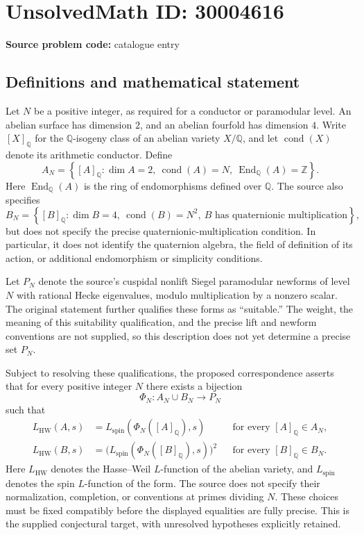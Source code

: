 \documentclass[11pt]{article}
\newcommand{\Z}{\mathbb{Z}}
\newcommand{\Q}{\mathbb{Q}}
\begin{document}
\section*{UnsolvedMath ID: 30004616}
\textbf{Source problem code:} catalogue entry
\subsection{Definitions and mathematical statement}
Let \(N\) be a positive integer, as required for a conductor or paramodular level. An abelian surface has dimension \(2\), and an abelian fourfold has dimension \(4\). Write \([X]_{\Q}\) for the \(\Q\)-isogeny class of an abelian variety \(X/\Q\), and let \(\operatorname{cond}(X)\) denote its arithmetic conductor. Define
\[
A_N=\left\{[A]_{\Q}: \dim A=2,\ \operatorname{cond}(A)=N,\ \operatorname{End}_{\Q}(A)=\Z\right\}.
\]
Here \(\operatorname{End}_{\Q}(A)\) is the ring of endomorphisms defined over \(\Q\). The source also specifies
\[
B_N=\left\{[B]_{\Q}: \dim B=4,\ \operatorname{cond}(B)=N^2,\ B\text{ has quaternionic multiplication}\right\},
\]
but does not specify the precise quaternionic-multiplication condition. In particular, it does not identify the quaternion algebra, the field of definition of its action, or additional endomorphism or simplicity conditions.

Let \(P_N\) denote the source's cuspidal nonlift Siegel paramodular newforms of level \(N\) with rational Hecke eigenvalues, modulo multiplication by a nonzero scalar. The original statement further qualifies these forms as ``suitable.'' The weight, the meaning of this suitability qualification, and the precise lift and newform conventions are not supplied, so this description does not yet determine a precise set \(P_N\).

Subject to resolving these qualifications, the proposed correspondence asserts that for every positive integer \(N\) there exists a bijection
\[
\Phi_N:A_N\cup B_N\longrightarrow P_N
\]
such that
\[
\begin{aligned}
L_{\mathrm{HW}}(A,s)&=L_{\mathrm{spin}}(\Phi_N([A]_{\Q}),s)
&&\text{for every }[A]_{\Q}\in A_N,\\
L_{\mathrm{HW}}(B,s)&=\bigl(L_{\mathrm{spin}}(\Phi_N([B]_{\Q}),s)\bigr)^2
&&\text{for every }[B]_{\Q}\in B_N.
\end{aligned}
\]
Here \(L_{\mathrm{HW}}\) denotes the Hasse--Weil \(L\)-function of the abelian variety, and \(L_{\mathrm{spin}}\) denotes the spin \(L\)-function of the form. The source does not specify their normalization, completion, or conventions at primes dividing \(N\). These choices must be fixed compatibly before the displayed equalities are fully precise. This is the supplied conjectural target, with unresolved hypotheses explicitly retained.
\end{document}
